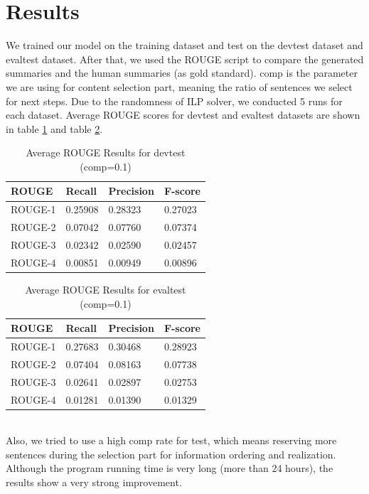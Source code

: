 \documentclass[11pt]{article}
\begin{document}
\section{Results}

We trained our model on the training dataset and test on the devtest dataset and evaltest dataset. After that, we used the ROUGE script to compare the generated summaries and the human summaries (as gold standard). comp is the parameter we are using for content selection part, meaning the ratio of sentences we select for next steps. Due to the randomness of ILP solver, we conducted 5 runs for each dataset. Average ROUGE scores for devtest and evaltest datasets are shown in table \ref{tab:1} and table \ref{tab:2}.\\
\begin{table}[!ht]
\centering
\caption{Average ROUGE Results for devtest (comp=0.1)}\label{tab:1}
\begin{tabular}{|l|l|l|l|}
\hline
ROUGE   & Recall  & Precision & F-score \\ \hline
ROUGE-1 & 0.25908 & 0.28323   & 0.27023 \\ \hline
ROUGE-2 & 0.07042 & 0.07760   & 0.07374 \\ \hline
ROUGE-3 & 0.02342 & 0.02590   & 0.02457 \\ \hline
ROUGE-4 & 0.00851 & 0.00949   & 0.00896 \\ \hline
\end{tabular}

\end{table}
\begin{table}[!ht]
\centering
\caption{Average ROUGE Results for evaltest (comp=0.1)}\label{tab:2}
\begin{tabular}{|l|l|l|l|}
\hline
ROUGE   & Recall  & Precision & F-score \\ \hline
ROUGE-1 & 0.27683 & 0.30468   & 0.28923 \\ \hline
ROUGE-2 & 0.07404 & 0.08163   & 0.07738 \\ \hline
ROUGE-3 & 0.02641 & 0.02897   & 0.02753 \\ \hline
ROUGE-4 & 0.01281 & 0.01390   & 0.01329 \\ \hline
\end{tabular}
\end{table}\\
\indent
Also, we tried to use a high comp rate for test, which means reserving more sentences during the selection part for information ordering and realization. Although the program running time is very long (more than 24 hours), the results show a very strong improvement.\\
\end{document}
